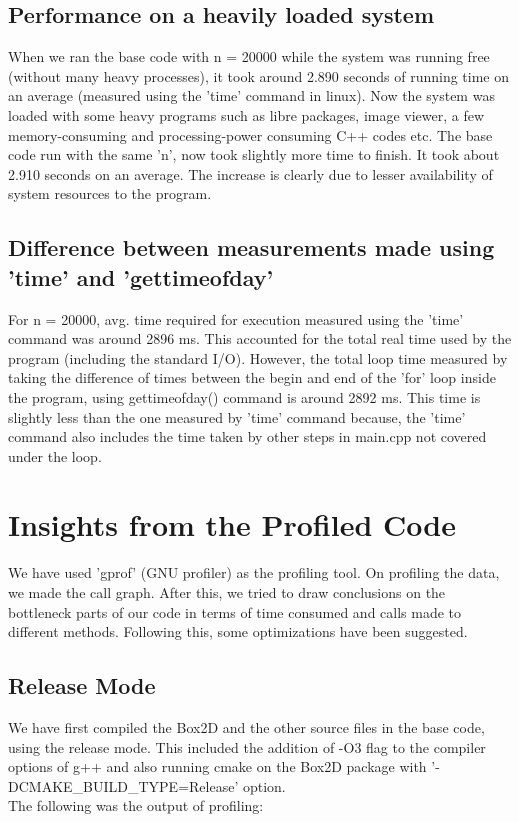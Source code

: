 \documentclass[11pt]{article}
\begin{document}
\subsection{Performance on a heavily loaded system}
When we ran the base code with n = 20000 while the system was running free (without many heavy processes), it took around 2.890 seconds of running time on an average (measured using the 'time' command in linux). Now the system was loaded with some heavy programs such as libre packages, image viewer, a few memory-consuming and processing-power consuming C++ codes etc. The base code run with the same 'n', now took slightly more time to finish. It took about 2.910 seconds on an average. The increase is clearly due to lesser availability of system resources to the program. 

\subsection{Difference between measurements made using 'time' and 'gettimeofday'}
For n = 20000, avg. time required for execution measured using the 'time' command was around 2896 ms. This accounted for the total real time used by the program (including the standard I/O). However, the total loop time measured by taking the difference of times between the begin and end of the 'for' loop inside the program, using gettimeofday() command is around 2892 ms. This time is slightly less than the one measured by 'time' command because, the 'time' command also includes the time taken by other steps in main.cpp not covered under the loop.\\


\section{Insights from the Profiled Code}

We have used 'gprof' (GNU profiler) as the profiling tool. On profiling the data, we made the call graph. After this, we tried to draw conclusions on the bottleneck parts of our code in terms of time consumed and calls made to different methods. Following this, some optimizations have been suggested.

\subsection{Release Mode}
We have first compiled the Box2D and the other source files in the base code, using the release mode. This included the addition of -O3 flag to the compiler options of g++ and also running cmake on the Box2D package with '-DCMAKE\_BUILD\_TYPE=Release' option. \\
The following was the output of profiling: \\ 
\end{document}
